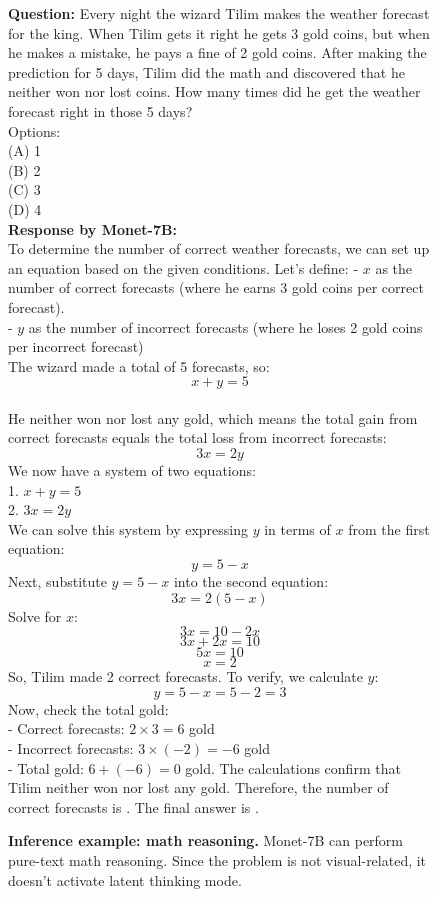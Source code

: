 \begin{figure}[t]
\centering
\begin{tcolorbox}[title=\textbf{Monet-7B Inference Example 6: Math Reasoning (from VisualPuzzles)},
    colback=gray!5, colframe=blue!60,
    left=1mm, right=1mm, top=1mm, bottom=1mm,
    enhanced, sharp corners, width=\textwidth]

\textbf{Question:} Every night the wizard Tilim makes the weather forecast for the king. When Tilim gets it right he gets 3 gold coins, but when he makes a mistake, he pays a fine of 2 gold coins. After making the prediction for 5 days, Tilim did the math and discovered that he neither won nor lost coins. How many times did he get the weather forecast right in those 5 days?\\                             Options:\\                                                                                                                                (A) 1\\
(B) 2\\
(C) 3\\
(D) 4\\[4pt]


\textbf{Response by Monet-7B:}\\
To determine the number of correct weather forecasts, we can set up an equation based on the given conditions. Let's define:               - \( x \) as the number of correct forecasts (where he earns 3 gold coins per correct forecast).\\
- \( y \) as the number of incorrect forecasts (where he loses 2 gold coins per incorrect forecast)\\
The wizard made a total of 5 forecasts, so:\\
\[ x + y = 5 \]\\
He neither won nor lost any gold, which means the total gain from correct forecasts equals the total loss from incorrect forecasts: \[ 3x = 2y \]We now have a system of two equations:\\
1. \( x + y = 5 \)\\
2. \( 3x = 2y \)\\
We can solve this system by expressing \( y \) in terms of \( x \) from the first equation:\[ y = 5 - x \]Next, substitute \( y = 5 - x \) into the second equation:\[ 3x = 2(5 - x) \]Solve for \( x \):\[ 3x = 10 - 2x \]\[ 3x + 2x = 10 \]\[ 5x = 10 \]\[ x = 2 \]So, Tilim made 2 correct forecasts. To verify, we calculate \( y \):\[ y = 5 - x = 5 - 2 = 3 \]Now, check the total gold:\\
- Correct forecasts: \( 2 \times 3 = 6 \) gold\\
- Incorrect forecasts: \( 3 \times (-2) = -6 \) gold\\
- Total gold: \( 6 + (-6) = 0 \) gold. The calculations confirm that Tilim neither won nor lost any gold. Therefore, the number of correct forecasts is . The final answer is .


\end{tcolorbox}
\caption{\textbf{Inference example: math reasoning.} Monet-7B can perform pure-text math reasoning. Since the problem is not visual-related, it doesn't activate latent thinking mode.}
\label{fig:inference_example6}
\end{figure}